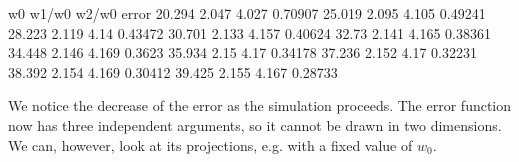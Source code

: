 \documentclass[letterpaper,10pt,english]{jupyterBook}
\begin{document}
\begin{sphinxVerbatim}[commandchars=\\\{\}]
   w0   w1/w0  w2/w0 error
\PYGZhy{}20.294 2.047 \PYGZhy{}4.027 0.70907
\PYGZhy{}25.019 2.095 \PYGZhy{}4.105 0.49241
\PYGZhy{}28.223 2.119 \PYGZhy{}4.14 0.43472
\PYGZhy{}30.701 2.133 \PYGZhy{}4.157 0.40624
\PYGZhy{}32.73 2.141 \PYGZhy{}4.165 0.38361
\PYGZhy{}34.448 2.146 \PYGZhy{}4.169 0.3623
\PYGZhy{}35.934 2.15 \PYGZhy{}4.17 0.34178
\PYGZhy{}37.236 2.152 \PYGZhy{}4.17 0.32231
\PYGZhy{}38.392 2.154 \PYGZhy{}4.169 0.30412
\PYGZhy{}39.425 2.155 \PYGZhy{}4.167 0.28733
\end{sphinxVerbatim}

\sphinxAtStartPar
We notice the decrease of the error as the simulation proceeds. The error function now has three independent arguments, so it cannot be drawn in two dimensions. We can, however, look at its projections, e.g. with a fixed value of \( w_0 \).
\end{document}
